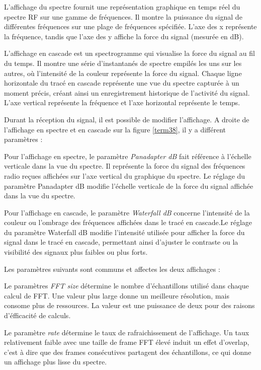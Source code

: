 L'affichage du spectre fournit une représentation graphique en temps réel du spectre RF sur une gamme de fréquences.
Il montre la puissance du signal de différentes fréquences sur une plage de fréquences spécifiée.
L'axe des x représente la fréquence, tandis que l'axe des y affiche la force du signal (mesurée en dB).

L'affichage en cascade est un spectrogramme qui visualise la force du signal au fil du temps.
Il montre une série d'instantanés de spectre empilés les uns sur les autres, où l'intensité de la couleur représente la force du signal.
Chaque ligne horizontale du tracé en cascade représente une vue du spectre capturée à un moment précis, créant ainsi un enregistrement historique de l'activité du signal.
L'axe vertical représente la fréquence et l'axe horizontal représente le temps.

Durant la réception du signal, il est possible de modifier l'affichage. A droite de l'affichage en spectre et en cascade sur la figure \ref{term38}, il y a différent paramètres :

Pour l'affichage en spectre, le paramètre \textit{Panadapter dB} fait référence à l'échelle verticale dans la vue du spectre. Il représente la force du signal des fréquences radio reçues affichées sur l'axe vertical du graphique du spectre. Le réglage du paramètre Panadapter dB modifie l’échelle verticale de la force du signal affichée dans la vue du spectre.

Pour l'affichage en cascade, le paramètre \textit{Waterfall dB} concerne l'intensité de la couleur ou l'ombrage des fréquences affichées dans le tracé en cascade.Le réglage du paramètre Waterfall dB modifie l'intensité utilisée pour afficher la force du signal dans le tracé en cascade, permettant ainsi d'ajuster le contraste ou la visibilité des signaux plus faibles ou plus forts.

Les paramètres suivants sont communs et affectes les deux affichages :

Le paramètres \textit{FFT size} détermine le nombre d'échantillons utilisé dans chaque calcul de FFT. Une valeur plus large donne un meilleure résolution, mais consome plus de ressources. La valeur est une puissance de deux pour des raisons d'éfficacité de calculs.

Le paramètre \textit{rate} détermine le taux de rafraichissement de l'affichage. Un taux relativement faible avec une taille de frame FFT élevé induit un effet d'overlap, c'est à dire que des frames consécutives partagent des échantillons, ce qui donne un affichage plus lisse du spectre.


